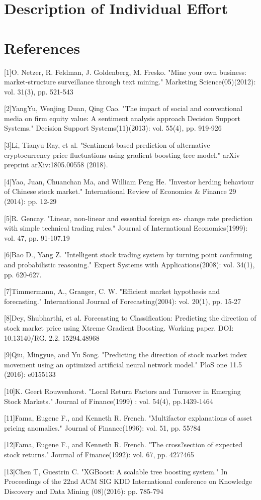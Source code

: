 \documentclass[letterpaper]{article}
\begin{document}
\section{Description of Individual Effort}

\section*{References}
[1]O. Netzer, R. Feldman, J. Goldenberg, M. Fresko. "Mine your own business: market-structure surveillance through text mining." Marketing Science(05)(2012): vol. 31(3), pp. 521-543

[2]YangYu, Wenjing Duan, Qing Cao. "The impact of social and conventional media on firm equity value: A sentiment analysis approach 
Decision Support Systems." Decision Support Systems(11)(2013): vol. 55(4), pp. 919-926

[3]Li, Tianyu Ray, et al. "Sentiment-based prediction of alternative cryptocurrency price fluctuations using gradient boosting tree model." arXiv preprint arXiv:1805.00558 (2018). 

[4]Yao, Juan, Chuanchan Ma, and William Peng He. "Investor herding behaviour of Chinese stock market." International Review of Economics \& Finance 29 (2014): pp. 12-29

[5]R. Gencay. "Linear, non-linear and essential foreign ex-
change rate prediction with simple technical trading rules." Journal of International Economics(1999): vol. 47, pp. 91-107.19

[6]Bao D., Yang Z. "Intelligent stock trading system by turning point confirming and probabilistic reasoning." Expert Systems with Applications(2008): vol. 34(1), pp. 620-627.

[7]Timmermann, A., Granger, C. W.  "Efficient market hypothesis and forecasting." International Journal of Forecasting(2004): vol. 20(1), pp. 15-27 

[8]Dey, Shubharthi, et al. Forecasting to Classification: Predicting the direction of stock market price using Xtreme Gradient Boosting. Working paper. DOI: 10.13140/RG. 2.2. 15294.48968

[9]Qiu, Mingyue, and Yu Song. "Predicting the direction of stock market index movement using an optimized artificial neural network model." PloS one 11.5 (2016): e0155133

[10]K. Geert Rouwenhorst. "Local Return Factors and Turnover in Emerging Stock Markets." Journal of Finance(1999) : vol. 54(4), pp.1439-1464

[11]Fama, Eugene F., and Kenneth R. French. "Multifactor explanations of asset pricing anomalies." Journal of Finance(1996): vol. 51, pp. 55?84

[12]Fama, Eugene F., and Kenneth R. French. "The cross?section of expected stock returns." Journal of Finance(1992): vol. 67, pp. 427?465

[13]Chen T, Guestrin C. "XGBoost: A scalable tree boosting system." In Proceedings of the 22nd ACM SIG KDD International conference on Knowledge Discovery and Data Mining (08)(2016): pp. 785-794
\end{document}
